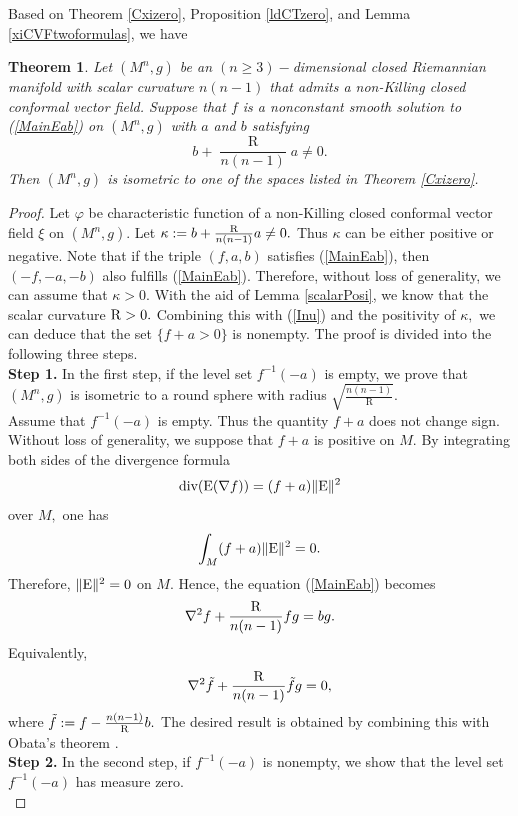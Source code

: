 \documentclass[10pt,leqno,oneside]{amsart}
\newtheorem{Thm}{Theorem}
\begin{document}
{       Based on Theorem \ref{Cxizero}, Proposition \ref{ldCTzero}, and Lemma \ref{xiCVFtwoformulas}, we have
    \begin{Thm}\label{CSS}
        Let $(M^n, g)$ be an $(n\ge3)-$dimensional closed Riemannian manifold with scalar curvature $n(n-1)$ that admits a non-Killing closed conformal vector field. Suppose that $f$ is a nonconstant smooth solution to (\ref{MainEab}) on $(M^n, g)$ with $a$ and $b$ satisfying
          \begin{equation}\label{ba=0}
            b+\frac{\operatorname R}{n(n-1)}a\neq0.
          \end{equation}
        Then $(M^n, g)$ is isometric to one of the spaces listed in Theorem {\rm\ref{Cxizero}}.
    \end{Thm}
    \begin{proof}   %
        Let $\varphi$ be characteristic function of a non-Killing closed conformal vector field $\xi$ on $(M^n, g)$. Let $\kappa:=b+\frac{{\rm R}}{n(n-1)}a\neq0.$ Thus $\kappa$ can be either positive or negative. Note that if the triple $(f, a, b)$ satisfies (\ref{MainEab}), then $(-f,-a,-b)$ also fulfills (\ref{MainEab}). Therefore, without loss of generality, we can assume that $\kappa>0.$ With the aid of Lemma \ref{scalarPosi}, we know that the scalar curvature ${\rm R}>0.$ Combining this with (\ref{Inu}) and the positivity of $\kappa,$ we can deduce that the set \(\{f+a>0\}\) is nonempty. The proof is divided into the following three steps.\\
    {\bf Step 1.}  In the first step, if the level set $f^{-1}(-a)$ is empty, we prove that $(M^n, g)$ is isometric to a round sphere with radius $\sqrt{\frac{n(n-1)}{\operatorname R}}.$\\
        Assume that $f^{-1}(-a)$ is empty. Thus the quantity $f+a$ does not change sign. Without loss of generality, we suppose that $f+a$ is positive on $M.$ By integrating both sides of the divergence formula
        $$\text{div}({\rm E}(\nabla f))=(f+a)\|{\rm E}\|^2$$
        over $M,$ one has
        \[\int_M(f+a)\|{\rm E}\|^2=0.\]
        Therefore, $\|{\rm E}\|^2=0$ on $M.$ Hence, the equation (\ref{MainEab}) becomes
        \[\nabla^2f+\frac{{\rm{R}}}{n(n-1)}fg=bg.\]
        Equivalently,
        \[\nabla^2\tilde{f}+\frac{{\rm{R}}}{n(n-1)}\tilde{f}g=0,\]
        where $\tilde{f}:=f-\frac{n(n-1)}{{\rm{R}}}b.$ The desired result is obtained by combining this with Obata's theorem \cite[Theorem A]{Obata1962}.\\
    {\bf Step 2.} In the second step, if $f^{-1}(-a)$ is nonempty, we show that the level set $f^{-1}(-a)$ has measure zero.\\

\end{proof}}
\end{document}
